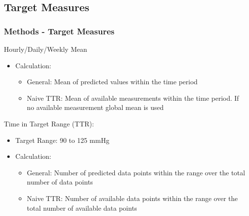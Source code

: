 \documentclass[
	8pt, %
]{beamer}
\begin{document}
\subsection{Target Measures}

\begin{frame}
	\frametitle{Methods - Target Measures}

	Hourly/Daily/Weekly Mean
	\begin{itemize}
		\item Calculation:
		\begin{itemize}
			\item General: Mean of predicted values within the time period
			\item Naive TTR: Mean of available measurements within the time period. If no available measurement
			global mean is used
		\end{itemize}
	\end{itemize}

	\bigskip

	Time in Target Range (TTR):
	\begin{itemize}
		\item Target Range: 90 to 125 mmHg
		\item Calculation:
		\begin{itemize}
			\item General: Number of predicted data points within the range over the total number of data points
			\item Naive TTR: Number of available data points within the range over the total number of available data points
		\end{itemize}
	\end{itemize}


\end{frame}
\end{document}

